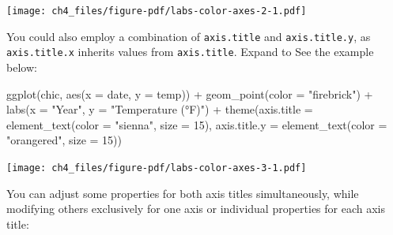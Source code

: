 \documentclass[
  letterpaper,
]{scrbook}
\newenvironment{Shaded}{\begin{snugshade}}{\end{snugshade}}
\newcommand{\AttributeTok}[1]{\textcolor[rgb]{0.40,0.45,0.13}{#1}}
\newcommand{\DecValTok}[1]{\textcolor[rgb]{0.68,0.00,0.00}{#1}}
\newcommand{\FunctionTok}[1]{\textcolor[rgb]{0.28,0.35,0.67}{#1}}
\newcommand{\NormalTok}[1]{\textcolor[rgb]{0.00,0.23,0.31}{#1}}
\newcommand{\SpecialCharTok}[1]{\textcolor[rgb]{0.37,0.37,0.37}{#1}}
\newcommand{\StringTok}[1]{\textcolor[rgb]{0.13,0.47,0.30}{#1}}
\begin{document}
\texttt{[image: ch4\_files/figure-pdf/labs-color-axes-2-1.pdf]}

\begin{tcolorbox}[enhanced jigsaw, rightrule=.15mm, arc=.35mm, title=\textcolor{quarto-callout-tip-color}{\faLightbulb}\hspace{0.5em}{Customising Invidual Axis}, colback=white, toptitle=1mm, colbacktitle=quarto-callout-tip-color!10!white, breakable, left=2mm, opacityback=0, leftrule=.75mm, bottomrule=.15mm, bottomtitle=1mm, colframe=quarto-callout-tip-color-frame, coltitle=black, toprule=.15mm, opacitybacktitle=0.6, titlerule=0mm]

You could also employ a combination of \texttt{axis.title} and
\texttt{axis.title.y}, as \texttt{axis.title.x} inherits values from
\texttt{axis.title}. Expand to See the example below:

\begin{Shaded}
\begin{Highlighting}[]
\FunctionTok{ggplot}\NormalTok{(chic, }\FunctionTok{aes}\NormalTok{(}\AttributeTok{x =}\NormalTok{ date, }\AttributeTok{y =}\NormalTok{ temp)) }\SpecialCharTok{+}
  \FunctionTok{geom\_point}\NormalTok{(}\AttributeTok{color =} \StringTok{"firebrick"}\NormalTok{) }\SpecialCharTok{+}
  \FunctionTok{labs}\NormalTok{(}\AttributeTok{x =} \StringTok{"Year"}\NormalTok{, }\AttributeTok{y =} \StringTok{"Temperature (°F)"}\NormalTok{) }\SpecialCharTok{+}
  \FunctionTok{theme}\NormalTok{(}\AttributeTok{axis.title =} \FunctionTok{element\_text}\NormalTok{(}\AttributeTok{color =} \StringTok{"sienna"}\NormalTok{, }\AttributeTok{size =} \DecValTok{15}\NormalTok{),}
        \AttributeTok{axis.title.y =} \FunctionTok{element\_text}\NormalTok{(}\AttributeTok{color =} \StringTok{"orangered"}\NormalTok{, }\AttributeTok{size =} \DecValTok{15}\NormalTok{))}
\end{Highlighting}
\end{Shaded}

\texttt{[image: ch4\_files/figure-pdf/labs-color-axes-3-1.pdf]}

\end{tcolorbox}

You can adjust some properties for both axis titles simultaneously,
while modifying others exclusively for one axis or individual properties
for each axis title:
\end{document}
